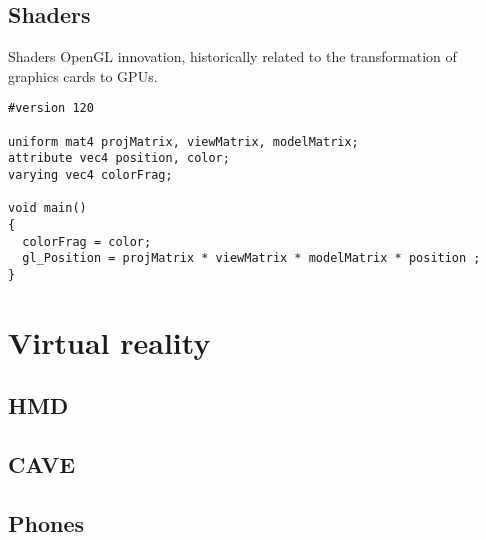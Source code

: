 \documentclass[12pt]{article}
\begin{document}
\subsection{Shaders}

\begin{frame}[fragile]{Shaders}
OpenGL innovation, historically related to the transformation of
graphics cards to GPUs.

\begin{verbatim}
#version 120

uniform mat4 projMatrix, viewMatrix, modelMatrix;
attribute vec4 position, color;
varying vec4 colorFrag;

void main()
{
  colorFrag = color;
  gl_Position = projMatrix * viewMatrix * modelMatrix * position ;
}
\end{verbatim}
\end{frame}

\section{Virtual reality}

\subsection{HMD}

\subsection{CAVE}

\subsection{Phones}
\end{document}
